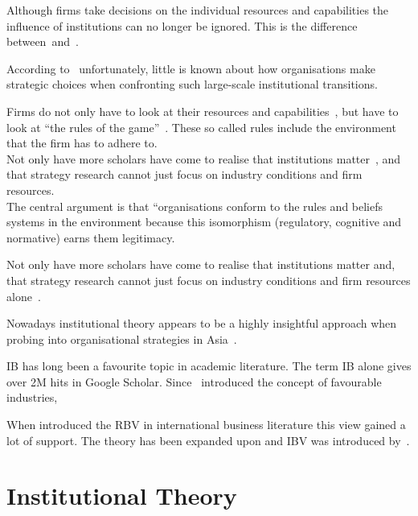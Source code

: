 Although firms take decisions on the individual resources and capabilities \cite{Barney:1991} the influence of institutions can no longer be ignored. This is the difference between~\rbv and~\ibv. 

According to~\cite{Peng:2003} unfortunately, little is known about how organisations make strategic choices when confronting such large-scale institutional transitions.



 Firms do not only have to look at their resources and capabilities~\cite{Barney:1991}, but have to look at ``the rules of the game''~\cite{Scott:1995}. These so called rules include the environment that the firm \mne has to adhere to.\\


Not only have   more scholars have come to realise that institutions matter~\cite{Powell:1991,Scott:1995}, and that strategy research cannot just focus on industry conditions and firm resources.\\

The central argument is that “organisations conform to the rules and beliefs systems in the environment because this isomorphism (regulatory, cognitive and normative) earns them legitimacy.

Not only have more scholars have come to realise that institutions matter and, that strategy research cannot just focus on industry conditions and firm resources alone~\cite{Powell:1991,Scott:1995}.

Nowadays institutional theory appears to be a highly insightful approach when probing into organisational strategies in Asia~\cite{Hoskisson:2000}.

\Gls{IB} has long been a favourite topic in academic literature. The term \gls{IB} alone gives over 2M hits in Google Scholar. Since~\cite{Porter:1980} introduced the concept of favourable industries, 

When introduced the \gls{RBV} in international business literature this view gained a lot of support. 
The theory has been expanded upon and \gls{IBV} was introduced by~\cite{Kostova:1999,Meyer:2009,Wang:2012}.

\section{Institutional Theory}


